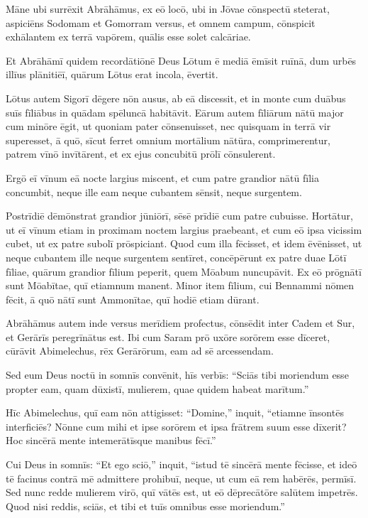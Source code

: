 \Versus Māne ubi surrēxit Abrāhāmus, ex eō locō, ubi in Jōvae cōnspectū steterat,
\Versus aspiciēns Sodomam et Gomorram versus, et omnem campum, cōnspicit exhālantem ex terrā vapōrem, quālis esse solet calcāriae.

\Versus Et Abrāhāmī quidem recordātiōnē Deus Lōtum ē mediā ēmīsit ruīnā, dum urbēs illīus plānitiēī, quārum Lōtus erat incola, ēvertit.

\Versus Lōtus autem Sigorī dēgere nōn ausus, ab eā discessit, et in monte cum duābus suīs fīliābus in quādam spēluncā habitāvit.
\Versus Eārum autem fīliārum nātū major cum minōre ēgit, ut quoniam pater cōnsenuisset, nec quisquam in terrā vir superesset, ā quō, sīcut ferret omnium mortālium nātūra, comprimerentur,
\Versus patrem vīnō invītārent, et ex ejus concubitū prōlī cōnsulerent.

\Versus Ergō eī vīnum eā nocte largius miscent, et cum patre grandior nātū fīlia concumbit, neque ille eam neque cubantem sēnsit, neque surgentem.

\Versus Postrīdiē dēmōnstrat grandior jūniōrī, sēsē prīdiē cum patre cubuisse. Hortātur, ut eī vīnum etiam in proximam noctem largius praebeant, et cum eō ipsa vicissim cubet, ut ex patre subolī prōspiciant.
\Versus Quod cum illa fēcisset, et idem ēvēnisset, ut neque cubantem ille neque surgentem sentīret,
\Versus concēpērunt ex patre duae Lōtī fīliae,
\Versus quārum grandior fīlium peperit, quem Mōabum nuncupāvit. Ex eō prōgnātī sunt Mōabītae, quī etiamnum manent.
\Versus Minor item fīlium, cui Bennammi nōmen fēcit, ā quō nātī sunt Ammonītae, quī hodiē etiam dūrant.



\Caput
\Versus Abrāhāmus autem inde versus merīdiem profectus, cōnsēdit inter Cadem et Sur, et Gerārīs peregrīnātus est.
\Versus Ibi cum Saram prō uxōre sorōrem esse dīceret, cūrāvit Abimelechus, rēx Gerārōrum, eam ad sē arcessendam.

\Versus Sed eum Deus noctū in somnīs convēnit, hīs verbīs: ``Sciās tibi moriendum esse propter eam, quam dūxistī, mulierem, quae quidem habeat marītum.''

\Versus Hīc Abimelechus, quī eam nōn attigisset: ``Domine,'' inquit, ``etiamne īnsontēs interficiēs?
\Versus Nōnne cum mihi et ipse sorōrem et ipsa frātrem suum esse dīxerit? Hoc sincērā mente intemerātīsque manibus fēcī.''

\Versus Cui Deus in somnīs: ``Et ego sciō,'' inquit, ``istud tē sincērā mente fēcisse, et ideō tē facinus contrā mē admittere prohibuī, neque, ut cum eā rem habērēs, permīsī.
\Versus Sed nunc redde mulierem virō, quī vātēs est, ut eō dēprecātōre salūtem impetrēs. Quod nisi reddis, sciās, et tibi et tuīs omnibus esse moriendum.''

